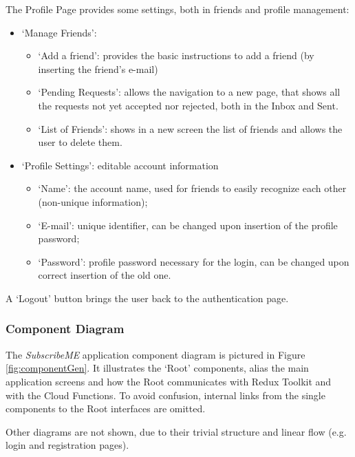 \documentclass[12pt]{article}
\begin{document}
\vspace{0.5cm}
\vspace{0.2cm}

\noindent The Profile Page provides some settings, both in friends and profile management: \begin{itemize}
    \item `Manage Friends':
          \begin{itemize}
              \item `Add a friend': provides the basic instructions to add a friend (by inserting the friend's e-mail)
              \item `Pending Requests': allows the navigation to a new page, that shows all the requests not yet accepted nor rejected, both in the Inbox and Sent.
              \item `List of Friends': shows in a new screen the list of friends and allows the user to delete them.
          \end{itemize}
    \item `Profile Settings': editable account information
          \begin{itemize}
              \item `Name': the account name, used for friends to easily recognize each other (non-unique information);
              \item `E-mail': unique identifier, can be changed upon insertion of the profile password;
              \item `Password': profile password necessary for the login, can be changed upon correct insertion of the old one.
          \end{itemize}
\end{itemize}

A `Logout' button brings the user back to the authentication page.

\subsubsection{Component Diagram}
The \textit{SubscribeME} application component diagram is pictured in Figure \ref{fig:componentGen}. It illustrates the `Root' components, alias the main application screens and how the Root communicates with Redux Toolkit and with the Cloud Functions. To avoid confusion, internal links from the single components to the Root interfaces are omitted.

Other diagrams are not shown, due to their trivial structure and linear flow (e.g. login and registration pages).
\end{document}
